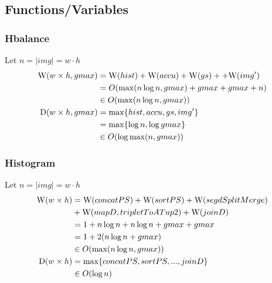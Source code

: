     \subsection*{Functions/Variables}

    \subsubsection*{Hbalance}
      Let $n = |img| = w\cdot h$
      \begin{equation*}
      \begin{split}
      \W(w \times h,gmax)
            & = \W(hist) + \W(accu) + \W(gs) + \comment{\W(expandPS)} + \W(img') \\
            & = O( \max(n \log n, gmax) + gmax + gmax \comment{ + 1} + n) \\
            & \in O(\max(n \log n, gmax)) \\
      \D(w \times h,gmax)
          & = \max \{ hist, accu, gs\comment{, expandPS}, img'\} \\
          & = \max \{\log n, \log gmax \} \\
          & \in O(\log \max(n,gmax)) \\
      \end{split}
      \end{equation*}
        
    \subsubsection*{Histogram}
      Let $n = |img| = w\cdot h$
      \begin{equation*}
      \begin{split}
      \W(w \times h)
            & = \W(concatPS) + \W(sortPS) + \W(segdSplitMerge) \\
            & + \W(mapD,tripletToATup2) + \W(joinD) \\
            & = 1 + n \log n + n \log n + gmax + gmax \\
            & = 1 + 2 (n \log n + gmax) \\
            & \in O(\max(n \log n, gmax)) \\
      \D(w \times h)
            & = \max \{ concatPS,sortPS,...,joinD\} \\
            & \in O(\log n) \\
      \end{split}
      \end{equation*}
    
